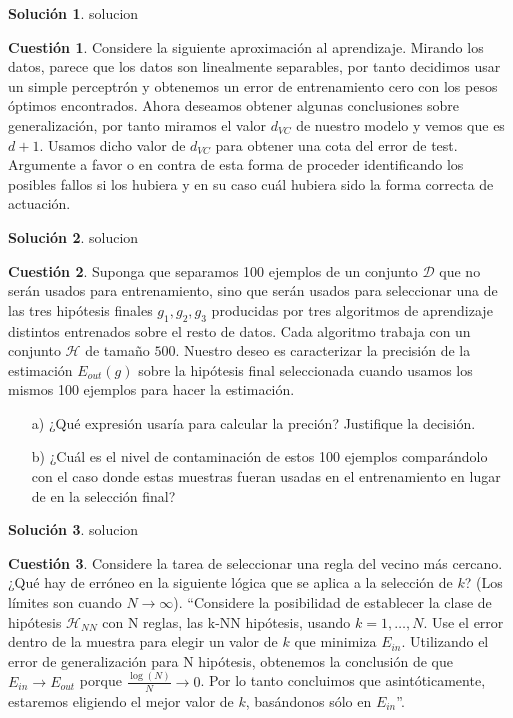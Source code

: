 \documentclass[a4paper, 11pt]{article}
\theoremstyle{definition}
\newtheorem{cuestion}{Cuestión}
\newtheorem*{solucion}{Solución}
\begin{document}
  \begin{solucion}
    solucion
  \end{solucion}

  \begin{cuestion}
    Considere la siguiente aproximación al aprendizaje. Mirando los datos, parece que los datos son linealmente separables, por tanto decidimos usar un simple perceptrón y obtenemos un error de entrenamiento cero con los pesos óptimos encontrados. Ahora deseamos obtener algunas conclusiones sobre generalización, por tanto miramos el valor $d_{VC}$ de nuestro modelo y vemos que es $d+1$. Usamos dicho valor de $d_{VC}$ para obtener una cota del error de test. Argumente a favor o en contra de esta forma de proceder identificando los posibles fallos si los hubiera y en su caso cuál hubiera sido la forma correcta de actuación.
  \end{cuestion}

  \begin{solucion}
    solucion
  \end{solucion}

  \begin{cuestion}
    Suponga que separamos 100 ejemplos de un conjunto $\mathcal{D}$ que no serán usados para entrenamiento, sino que serán usados para seleccionar una de las tres hipótesis finales $g_1,g_2,g_3$ producidas por tres algoritmos de aprendizaje distintos entrenados sobre el resto de datos. Cada algoritmo trabaja con un conjunto $\mathcal{H}$ de tamaño $500$. Nuestro deseo es caracterizar la precisión de la estimación $E_{out}(g)$ sobre la hipótesis final seleccionada cuando usamos los mismos 100 ejemplos para hacer la estimación.

    \begin{enumerate}
      \item[a)] ¿Qué expresión usaría para calcular la preción? Justifique la decisión.
      \item[b)] ¿Cuál es el nivel de contaminación de estos 100 ejemplos comparándolo con el caso donde estas muestras fueran usadas en el entrenamiento en lugar de en la selección final?
    \end{enumerate}
  \end{cuestion}

  \begin{solucion}
    solucion
  \end{solucion}

  \begin{cuestion}
    Considere la tarea de seleccionar una regla del vecino más cercano. ¿Qué hay de erróneo en la siguiente lógica que se aplica a la selección de $k$? (Los límites son cuando $N \rightarrow \infty$). ``Considere la posibilidad de establecer la clase de hipótesis $\mathcal{H}_{NN}$ con N reglas, las k-NN hipótesis, usando $k=1,\ldots,N$. Use el error dentro de la muestra para elegir un valor de $k$ que minimiza $E_{in}$. Utilizando el error de generalización para N hipótesis, obtenemos la conclusión de que $E_{in} \rightarrow E_{out}$ porque $\frac{\log(N)}{N} \rightarrow 0$. Por lo tanto concluimos que asintóticamente, estaremos eligiendo el mejor valor de $k$, basándonos sólo en $E_{in}$''.
  \end{cuestion}
\end{document}
